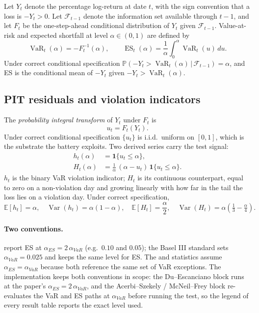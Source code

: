 \documentclass[11pt,a4paper]{article}
\newcommand{\VaR}{\operatorname{VaR}}
\newcommand{\ES}{\operatorname{ES}}
\newcommand{\E}{\mathbb{E}}
\newcommand{\Var}{\operatorname{Var}}
\newcommand{\Prob}{\mathbb{P}}
\newcommand{\one}{\mathbf{1}}
\newcommand{\given}{\,|\,}
\theoremstyle{plain}
\begin{document}
Let $Y_t$ denote the percentage log-return at date $t$, with the sign
convention that a loss is $-Y_t > 0$. Let $\mathcal{F}_{t-1}$ denote
the information set available through $t-1$, and let $F_t$ be the
one-step-ahead conditional distribution of $Y_t$ given
$\mathcal{F}_{t-1}$. Value-at-risk and expected shortfall at level
$\alpha \in (0,1)$ are defined by
\begin{equation}
  \VaR_t(\alpha) = -F_t^{-1}(\alpha),
  \qquad
  \ES_t(\alpha) = \frac{1}{\alpha} \int_0^\alpha \VaR_t(u)\, du.
  \label{eq:var-es-def}
\end{equation}
Under correct conditional specification $\Prob(-Y_t > \VaR_t(\alpha)
\given \mathcal{F}_{t-1}) = \alpha$, and ES is the conditional mean of
$-Y_t$ given $-Y_t > \VaR_t(\alpha)$.

\subsection{PIT residuals and violation indicators}
\label{sec:method-pit}

The \emph{probability integral transform} of $Y_t$ under $F_t$ is
\begin{equation}
  u_t = F_t(Y_t).
  \label{eq:pit}
\end{equation}
Under correct conditional specification $\{u_t\}$ is i.i.d.\ uniform
on $[0,1]$, which is the substrate the
\citet{du_escanciano_2017} battery exploits. Two derived series carry
the test signal:
\begin{align}
  h_t(\alpha) &= \one\{u_t \leq \alpha\}, \\
  H_t(\alpha) &= \frac{1}{\alpha}\,(\alpha - u_t)\, \one\{u_t \leq \alpha\}.
  \label{eq:h-H}
\end{align}
$h_t$ is the binary VaR violation indicator; $H_t$ is its continuous
counterpart, equal to zero on a non-violation day and growing linearly
with how far in the tail the loss lies on a violation day. Under
correct specification,
\begin{equation}
  \E[h_t] = \alpha,
  \quad \Var(h_t) = \alpha(1-\alpha),
  \quad \E[H_t] = \frac{\alpha}{2},
  \quad \Var(H_t) = \alpha\!\left(\tfrac{1}{3} - \tfrac{\alpha}{4}\right).
  \label{eq:moments}
\end{equation}

\paragraph{Two conventions.} \citet{du_escanciano_2017} report ES at
$\alpha_{ES} = 2\,\alpha_{VaR}$ (e.g.\ $0.10$ and $0.05$); the
Basel III standard \citep{bcbs_2019} sets $\alpha_{VaR} = 0.025$ and
keeps the same level for ES. The \citet{acerbi_szekely_2014} and
\citet{mcneil_frey_2000} statistics assume
$\alpha_{ES} = \alpha_{VaR}$ because both reference the same set of
VaR exceptions. The implementation keeps both conventions in scope:
the Du--Escanciano block runs at the paper's
$\alpha_{ES} = 2\,\alpha_{VaR}$, and the Acerbi--Szekely / McNeil--Frey
block re-evaluates the VaR and ES paths at $\alpha_{VaR}$ before
running the test, so the legend of every result table reports the
exact level used.
\end{document}
